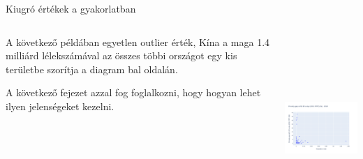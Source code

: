 \documentclass[english, aspectratio=169]{beamer}
\begin{document}
	\begin{frame}{Kiugró értékek a gyakorlatban}
		\begin{columns}
			\begin{column}{.5\textwidth}
				A következő példában egyetlen outlier érték, Kína a maga 1.4 milliárd lélekszámával az összes többi országot egy kis területbe szorítja a diagram bal oldalán.\par\medskip
				A következő fejezet azzal fog foglalkozni, hogy hogyan lehet ilyen jelenségeket kezelni.
			\end{column}
			\begin{column}{.5\textwidth}
				\begin{center}
					\includegraphics[width=7cm, height=7cm, keepaspectratio]{images/scatter_13.png}
				\end{center}
			\end{column}
		\end{columns}
	\end{frame}
	
\end{document}
